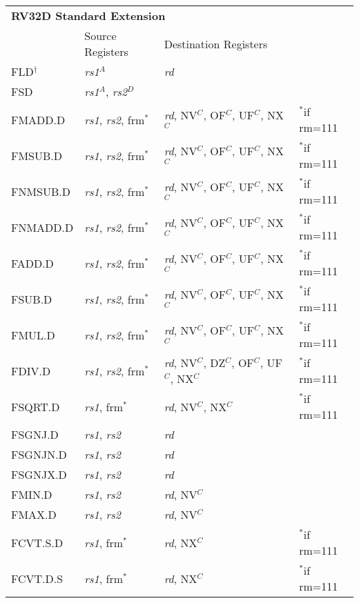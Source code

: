 \begin{tabular}{p{25mm}|p{3cm}|p{6cm}|p{10cm}}
  \multicolumn{4}{l}{\bf RV32D Standard Extension} \\
  \cline{2-3}
   & Source Registers & Destination Registers \\
  \cline{2-3}
   FLD$^\dagger$ & {\em rs1}$^A$ & {\em rd} &  \\
   \cline{2-3}
   FSD & {\em rs1}$^A$, {\em rs2}$^D$ &  &  \\
   \cline{2-3}
   FMADD.D & {\em rs1}, {\em rs2}, frm$^*$ & {\em rd}, NV$^C$, OF$^C$, UF$^C$, NX$^C$ & $^*$if rm=111 \\
   \cline{2-3}
   FMSUB.D & {\em rs1}, {\em rs2}, frm$^*$ & {\em rd}, NV$^C$, OF$^C$, UF$^C$, NX$^C$ & $^*$if rm=111 \\
   \cline{2-3}
   FNMSUB.D & {\em rs1}, {\em rs2}, frm$^*$ & {\em rd}, NV$^C$, OF$^C$, UF$^C$, NX$^C$ & $^*$if rm=111 \\
   \cline{2-3}
   FNMADD.D & {\em rs1}, {\em rs2}, frm$^*$ & {\em rd}, NV$^C$, OF$^C$, UF$^C$, NX$^C$ & $^*$if rm=111 \\
   \cline{2-3}
   FADD.D & {\em rs1}, {\em rs2}, frm$^*$ & {\em rd}, NV$^C$, OF$^C$, UF$^C$, NX$^C$ & $^*$if rm=111 \\
   \cline{2-3}
   FSUB.D & {\em rs1}, {\em rs2}, frm$^*$ & {\em rd}, NV$^C$, OF$^C$, UF$^C$, NX$^C$ & $^*$if rm=111 \\
   \cline{2-3}
   FMUL.D & {\em rs1}, {\em rs2}, frm$^*$ & {\em rd}, NV$^C$, OF$^C$, UF$^C$, NX$^C$ & $^*$if rm=111 \\
   \cline{2-3}
   FDIV.D & {\em rs1}, {\em rs2}, frm$^*$ & {\em rd}, NV$^C$, DZ$^C$, OF$^C$, UF$^C$, NX$^C$ & $^*$if rm=111 \\
   \cline{2-3}
   FSQRT.D & {\em rs1}, frm$^*$ & {\em rd}, NV$^C$, NX$^C$ & $^*$if rm=111 \\
   \cline{2-3}
   FSGNJ.D & {\em rs1}, {\em rs2} & {\em rd} &  \\
   \cline{2-3}
   FSGNJN.D & {\em rs1}, {\em rs2} & {\em rd} &  \\
   \cline{2-3}
   FSGNJX.D & {\em rs1}, {\em rs2} & {\em rd} &  \\
   \cline{2-3}
   FMIN.D & {\em rs1}, {\em rs2} & {\em rd}, NV$^C$ &  \\
   \cline{2-3}
   FMAX.D & {\em rs1}, {\em rs2} & {\em rd}, NV$^C$ &  \\
   \cline{2-3}
   FCVT.S.D & {\em rs1}, frm$^*$ & {\em rd}, NX$^C$ & $^*$if rm=111 \\
   \cline{2-3}
   FCVT.D.S & {\em rs1}, frm$^*$ & {\em rd}, NX$^C$ & $^*$if rm=111 \\

\end{tabular}
